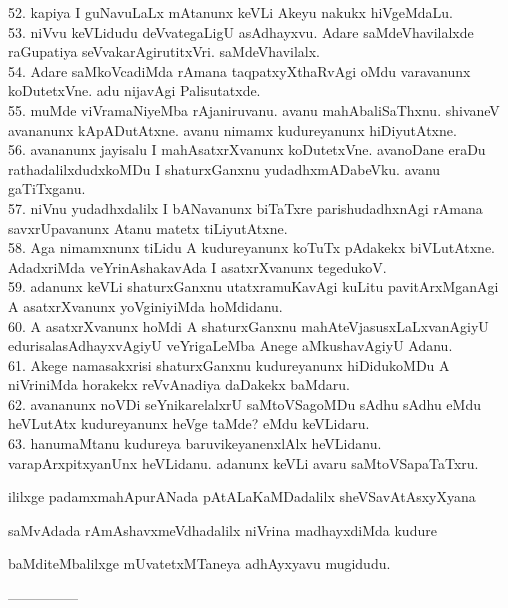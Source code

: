 \documentclass{article}
\begin{document}
52. kapiya I guNavuLaLx mAtanunx keVLi Akeyu nakukx hiVgeMdaLu.\\
53. niVvu keVLidudu deVvategaLigU asAdhayxvu. Adare saMdeVhavilalxde raGupatiya seVvakarAgirutitxVri. saMdeVhavilalx.\\
54. Adare saMkoVcadiMda rAmana taqpatxyXthaRvAgi oMdu varavanunx koDutetxVne. adu nijavAgi Palisutatxde.\\
55. muMde viVramaNiyeMba rAjaniruvanu. avanu mahAbaliSaThxnu. shivaneV avananunx kApADutAtxne. avanu nimamx kudureyanunx hiDiyutAtxne.\\
56. avananunx jayisalu I mahAsatxrXvanunx koDutetxVne. avanoDane eraDu rathadalilxdudxkoMDu I shaturxGanxnu yudadhxmADabeVku. avanu gaTiTxganu.\\
57. niVnu yudadhxdalilx I bANavanunx biTaTxre parishudadhxnAgi rAmana savxrUpavanunx Atanu matetx tiLiyutAtxne.\\
58. Aga nimamxnunx tiLidu A kudureyanunx koTuTx pAdakekx biVLutAtxne. AdadxriMda veYrinAshakavAda I asatxrXvanunx tegedukoV.\\
59. adanunx keVLi shaturxGanxnu utatxramuKavAgi kuLitu pavitArxMganAgi A asatxrXvanunx yoVginiyiMda hoMdidanu.\\
60. A asatxrXvanunx hoMdi A shaturxGanxnu mahAteVjasusxLaLxvanAgiyU edurisalasAdhayxvAgiyU veYrigaLeMba Anege aMkushavAgiyU Adanu.\\
61. Akege namasakxrisi shaturxGanxnu kudureyanunx hiDidukoMDu A niVriniMda horakekx reVvAnadiya daDakekx baMdaru.\\
62. avananunx noVDi seYnikarelalxrU saMtoVSagoMDu sAdhu sAdhu eMdu heVLutAtx kudureyanunx heVge taMde? eMdu keVLidaru.\\
63. hanumaMtanu kudureya baruvikeyanenxlAlx heVLidanu. varapArxpitxyanUnx heVLidanu. adanunx keVLi avaru saMtoVSapaTaTxru.

\begin{center}
ililxge padamxmahApurANada pAtALaKaMDadalilx sheVSavAtAsxyXyana
\end{center}

\begin{center}
saMvAdada rAmAshavxmeVdhadalilx niVrina madhayxdiMda kudure
\end{center}

\begin{center}
baMditeMbalilxge mUvatetxMTaneya adhAyxyavu mugidudu.
\end{center}

\begin{center}
---------------
\end{center}
\end{document}
